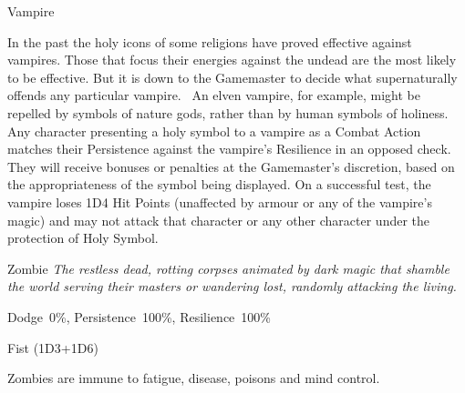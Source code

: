 \begin{samepage}
\begin{monsterbox}{Vampire}
\begin{rpg-monsteraction}
		In the past the holy icons of some religions have proved effective against vampires. Those that focus their energies against the undead are the most likely to be effective. But it is down to the Gamemaster to decide what supernaturally offends any particular vampire.  An elven vampire, for example, might be repelled by symbols of nature gods, rather than by human symbols of holiness. Any character presenting a holy symbol to a vampire as a Combat Action matches their Persistence against the vampire’s Resilience in an opposed check. They will receive bonuses or penalties at the Gamemaster’s discretion, based on the appropriateness of the symbol being displayed. On a successful test, the vampire loses 1D4 Hit Points (unaffected by armour or any of the vampire’s magic) and may not attack that character or any other character under the protection of Holy Symbol.
	\end{rpg-monsteraction}
\end{monsterbox}
\end{samepage}
	
\newpage

\begin{samepage}
\begin{monsterbox}{Zombie}
	\textit{The restless dead, rotting corpses animated by dark magic that shamble the world serving their masters or wandering lost, randomly attacking the living.}\\
	\rpghline
	\basics[%
        hitpoints  = 7, 
	majorwound = 4,
	damagemodifier = +1D6,
	powerpoints = 0,
	movementrate = 7m,
	armor = None,
	plunderrating = 0
	]
	\rpghline%
	\stats[ %
		STR = 3D6+12 (23),
		CON = 1D6    (4),
		DEX = 1D6+3  (7),
		SIZ = 3D6    (10),
		INT = 1D3    (2),
		POW = 0      (0),
		CHA = 1D3    (2)
	]
	\rpghline
	\begin{rpg-monsteraction}[Resistances]
		Dodge~0\%, Persistence~100\%, Resilience~100\%
	\end{rpg-monsteraction}
	\begin{rpg-monsteraction}
		Fist (1D3+1D6)
	\end{rpg-monsteraction}
	\begin{rpg-monsteraction}[Immunities]
		Zombies are immune to fatigue, disease, poisons and mind control.
	\end{rpg-monsteraction}
\end{monsterbox}
\end{samepage}
	
\newpage


